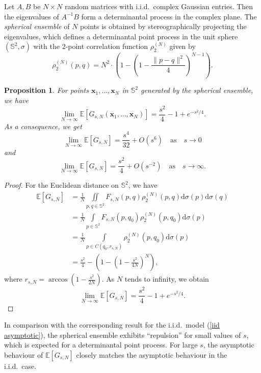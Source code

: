 \documentclass[a4paper,11pt]{amsart}
\newtheorem{prop}{Proposition}
\begin{document}
Let $A, B$ be $N\times N$ random matrices with i.i.d.\ complex Gaussian entries. Then 
the eigenvalues of  $A^{-1}B$ form a determinantal process in the complex plane. 
The \textit{spherical ensemble} of $N$ points is obtained by stereographically
projecting the eigenvalues, which defines a determinantal point process in the unit sphere $(\mathbb{S}^2,\sigma)$ with the $2$-point correlation function $\rho_2^{(N)}$  given by
$$\rho_2^{(N)}(p,q)=N^2\cdot \left(1-\left(1-\frac{\|p-q\|^2}{4}\right)^{N-1}\right).$$
\begin{prop}\label{spherical proposition}
 For points $\mathbf{x}_1,\dots,\mathbf{x}_N$ in $\mathbb{S}^2$ generated by the spherical ensemble, we have
\begin{equation*}
     \lim\limits_{N\rightarrow\infty}\mathbb{E}[G_{s,N}(\mathbf{x}_1,\dots,\mathbf{x}_N)]=\frac{s^2}{4}-1+e^{-s^2/4}.
\end{equation*}
As a consequence, we get
\begin{equation*}
     \lim\limits_{N\rightarrow\infty}\mathbb{E}[G_{s,N}]=\frac{s^4}{32}+O(s^6)\quad\text{as}\quad s\rightarrow 0
\end{equation*}
and 
\begin{equation*}
     \lim\limits_{N\rightarrow\infty}\mathbb{E}[G_{s,N}]= \frac{s^2}{4}+O(s^{-2})\quad\text{as}\quad s\rightarrow\infty.
\end{equation*}
\end{prop}
\begin{proof}
For the Euclidean distance on $\mathbb{S}^2$, we have
\begin{align*}
    \mathbb{E}[G_{s,N}]&=\frac{1}{N}\iint\limits_{p,q\in\mathbb{S}^2}F_{s,N}(p,q)\rho_2^{(N)}(p,q)\mathrm{d}\sigma(p)\mathrm{d}\sigma(q)
    \\ &=\frac{1}{N}\int\limits_{p\in\mathbb{S}^2}F_{s,N}(p,q_0)\rho_2^{(N)}(p,q_0)\mathrm{d}\sigma(p)
    \\ &=\frac{1}{N}\int\limits_{p\in C(q_0,r_{s,N})}\rho_2^{(N)}(p,q_0)\mathrm{d}\sigma(p)
    \\ &=\frac{s^2}{4}- \left(1-\left(1-\frac{s^2}{4N}\right)^{N}\right),
\end{align*}
where $r_{s,N}=\arccos(1-\frac{s^2}{2N})$. As $N$ tends to infinity, we obtain
$$\lim\limits_{N\rightarrow\infty}  \mathbb{E}[G_{s,N}]=\frac{s^2}{4}-1+e^{-s^2/4}.$$
\end{proof}
 In comparison with the corresponding result for the i.i.d.\ model (\ref{iid asymptotic}), the spherical ensemble exhibits ``repulsion'' for small values of $s$, which is expected for a determinantal point process. For large $s$, the asymptotic behaviour of $ \mathbb{E}[G_{s,N}]$ closely matches the asymptotic behaviour in the i.i.d.\ case.
\end{document}
